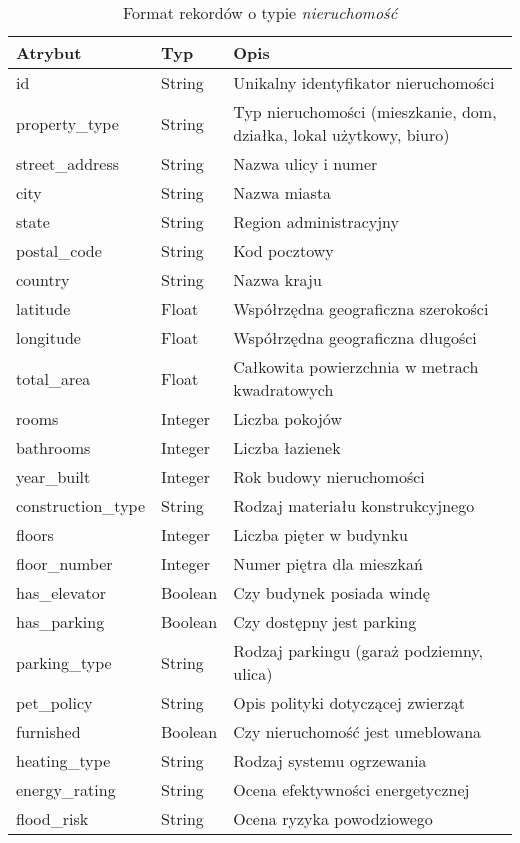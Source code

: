 \begin{table}[H]
    \caption{Format rekordów o typie \textit{nieruchomość}}
    \centering
    \begin{tabular}{|l|l|l|}
    \hline
    \textbf{Atrybut} & \textbf{Typ} & \textbf{Opis} \\
    \hline
    id & String & Unikalny identyfikator nieruchomości \\
    property\_type & String & Typ nieruchomości (mieszkanie, dom, działka, lokal użytkowy, biuro) \\
    street\_address & String & Nazwa ulicy i numer \\
    city & String & Nazwa miasta \\
    state & String & Region administracyjny \\
    postal\_code & String & Kod pocztowy \\
    country & String & Nazwa kraju \\
    latitude & Float & Współrzędna geograficzna szerokości \\
    longitude & Float & Współrzędna geograficzna długości \\
    total\_area & Float & Całkowita powierzchnia w metrach kwadratowych \\
    rooms & Integer & Liczba pokojów  \\
    bathrooms & Integer & Liczba łazienek \\
    year\_built & Integer & Rok budowy nieruchomości \\
    construction\_type & String & Rodzaj materiału konstrukcyjnego \\
    floors & Integer & Liczba pięter w budynku \\
    floor\_number & Integer & Numer piętra dla mieszkań \\
    has\_elevator & Boolean & Czy budynek posiada windę \\
    has\_parking & Boolean & Czy dostępny jest parking \\
    parking\_type & String & Rodzaj parkingu (garaż podziemny, ulica) \\ 
    pet\_policy & String & Opis polityki dotyczącej zwierząt \\
    furnished & Boolean & Czy nieruchomość jest umeblowana \\
    heating\_type & String & Rodzaj systemu ogrzewania \\
    energy\_rating & String & Ocena efektywności energetycznej \\
    flood\_risk & String & Ocena ryzyka powodziowego \\

\end{tabular}
\end{table}
